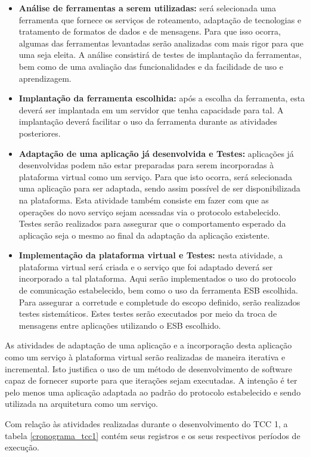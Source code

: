 \begin{itemize}
\item \textbf{Análise de ferramentas a serem utilizadas:} será selecionada uma ferramenta que fornece os serviços de roteamento, adaptação de tecnologias e tratamento de formatos de dados e de mensagens. Para que isso ocorra, algumas das ferramentas levantadas serão analizadas com mais rigor para que uma seja eleita. A análise consistirá de testes de implantação da ferramentas, bem como de uma avaliação das funcionalidades e da facilidade de uso e aprendizagem.
\item \textbf{Implantação da ferramenta escolhida:} após a escolha da ferramenta, esta deverá ser implantada em um servidor que tenha capacidade para tal. A implantação deverá facilitar o uso da ferramenta durante as atividades posteriores.
\item \textbf{Adaptação de uma aplicação já desenvolvida e Testes:} aplicações já desenvolvidas podem não estar preparadas para serem incorporadas à plataforma virtual como um serviço. Para que isto ocorra, será selecionada uma aplicação para ser adaptada, sendo assim possível de ser disponibilizada na plataforma. Esta atividade também consiste em fazer com que as operações do novo serviço sejam acessadas via o protocolo estabelecido. Testes serão realizados para assegurar que o comportamento esperado da aplicação seja o mesmo ao final da adaptação da aplicação existente.
\item \textbf{Implementação da plataforma virtual e Testes:} nesta atividade, a plataforma virtual será criada e o serviço que foi adaptado deverá ser incorporado a tal plataforma. Aqui serão implementados o uso do protocolo de comunicação estabelecido, bem como o uso da ferramenta ESB escolhida. Para assegurar a corretude e completude do escopo definido, serão realizados testes sistemáticos. Estes testes serão executados por meio da troca de mensagens entre aplicações utilizando o ESB escolhido.
\end{itemize}

As atividades de adaptação de uma aplicação e a incorporação desta aplicação como um serviço à plataforma virtual serão realizadas de maneira iterativa e incremental. Isto justifica o uso de um método de desenvolvimento de software capaz de fornecer suporte para que iterações sejam executadas. A intenção é ter pelo menos uma aplicação adaptada ao padrão do protocolo estabelecido e sendo utilizada na arquitetura como um serviço.

Com relação às atividades realizadas durante o desenvolvimento do TCC 1, a tabela \ref{cronograma_tcc1} contém seus registros e os seus respectivos períodos de execução.


